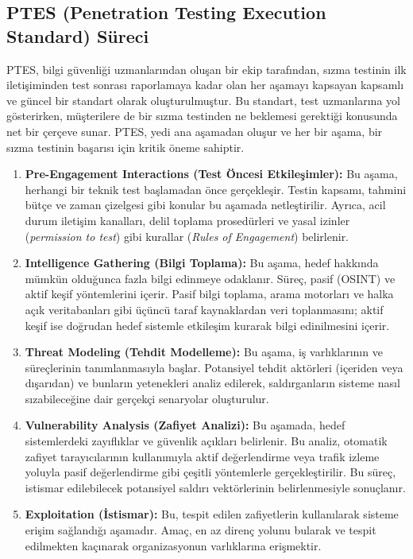 \subsection{PTES (Penetration Testing Execution Standard) Süreci}

PTES, bilgi güvenliği uzmanlarından oluşan bir ekip tarafından, sızma testinin ilk iletişiminden test sonrası raporlamaya kadar olan her aşamayı kapsayan kapsamlı ve güncel bir standart olarak oluşturulmuştur. Bu standart, test uzmanlarına yol gösterirken, müşterilere de bir sızma testinden ne beklemesi gerektiği konusunda net bir çerçeve sunar. PTES, yedi ana aşamadan oluşur ve her bir aşama, bir sızma testinin başarısı için kritik öneme sahiptir.

\begin{enumerate}
\item \textbf{Pre-Engagement Interactions (Test Öncesi Etkileşimler):} Bu aşama, herhangi bir teknik test başlamadan önce gerçekleşir. Testin kapsamı, tahmini bütçe ve zaman çizelgesi gibi konular bu aşamada netleştirilir. Ayrıca, acil durum iletişim kanalları, delil toplama prosedürleri ve yasal izinler (\textit{permission to test}) gibi kurallar (\textit{Rules of Engagement}) belirlenir.
\item \textbf{Intelligence Gathering (Bilgi Toplama):} Bu aşama, hedef hakkında mümkün olduğunca fazla bilgi edinmeye odaklanır. Süreç, pasif (OSINT) ve aktif keşif yöntemlerini içerir. Pasif bilgi toplama, arama motorları ve halka açık veritabanları gibi üçüncü taraf kaynaklardan veri toplanmasını; aktif keşif ise doğrudan hedef sistemle etkileşim kurarak bilgi edinilmesini içerir.
\item \textbf{Threat Modeling (Tehdit Modelleme):} Bu aşama, iş varlıklarının ve süreçlerinin tanımlanmasıyla başlar. Potansiyel tehdit aktörleri (içeriden veya dışarıdan) ve bunların yetenekleri analiz edilerek, saldırganların sisteme nasıl sızabileceğine dair gerçekçi senaryolar oluşturulur.
\item \textbf{Vulnerability Analysis (Zafiyet Analizi):} Bu aşamada, hedef sistemlerdeki zayıflıklar ve güvenlik açıkları belirlenir. Bu analiz, otomatik zafiyet tarayıcılarının kullanımıyla aktif değerlendirme veya trafik izleme yoluyla pasif değerlendirme gibi çeşitli yöntemlerle gerçekleştirilir. Bu süreç, istismar edilebilecek potansiyel saldırı vektörlerinin belirlenmesiyle sonuçlanır.
\item \textbf{Exploitation (İstismar):} Bu, tespit edilen zafiyetlerin kullanılarak sisteme erişim sağlandığı aşamadır. Amaç, en az direnç yolunu bularak ve tespit edilmekten kaçınarak organizasyonun varlıklarına erişmektir.

\end{enumerate}
